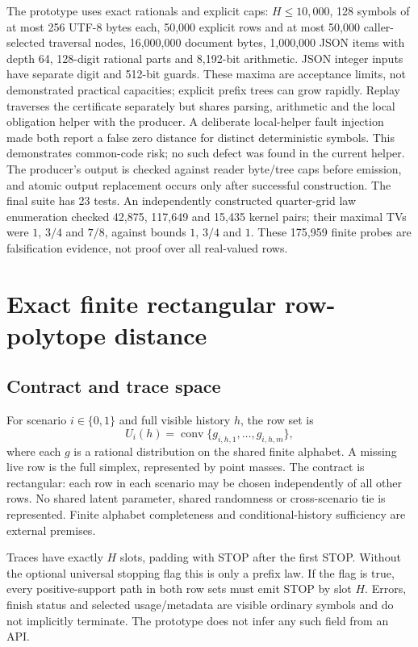 \documentclass[11pt,a4paper]{article}
\begin{document}
The prototype uses exact rationals and explicit caps: $H\leq10{,}000$, 128 symbols of at most 256 UTF-8 bytes each, 50,000 explicit rows and at most 50,000 caller-selected traversal nodes, 16,000,000 document bytes, 1,000,000 JSON items with depth 64, 128-digit rational parts and 8,192-bit arithmetic. JSON integer inputs have separate digit and 512-bit guards. These maxima are acceptance limits, not demonstrated practical capacities; explicit prefix trees can grow rapidly. Replay traverses the certificate separately but shares parsing, arithmetic and the local obligation helper with the producer. A deliberate local-helper fault injection made both report a false zero distance for distinct deterministic symbols. This demonstrates common-code risk; no such defect was found in the current helper. The producer's output is checked against reader byte/tree caps before emission, and atomic output replacement occurs only after successful construction. The final suite has 23 tests. An independently constructed quarter-grid law enumeration checked 42,875, 117,649 and 15,435 kernel pairs; their maximal TVs were $1$, $3/4$ and $7/8$, against bounds $1$, $3/4$ and $1$. These 175,959 finite probes are falsification evidence, not proof over all real-valued rows.

\section{Exact finite rectangular row-polytope distance}
\subsection{Contract and trace space}
For scenario $i\in\{0,1\}$ and full visible history $h$, the row set is
\[
U_i(h)=\operatorname{conv}\{g_{i,h,1},\ldots,g_{i,h,m}\},
\]
where each $g$ is a rational distribution on the shared finite alphabet. A missing live row is the full simplex, represented by point masses. The contract is rectangular: each row in each scenario may be chosen independently of all other rows. No shared latent parameter, shared randomness or cross-scenario tie is represented. Finite alphabet completeness and conditional-history sufficiency are external premises.

Traces have exactly $H$ slots, padding with STOP after the first STOP. Without the optional universal stopping flag this is only a prefix law. If the flag is true, every positive-support path in both row sets must emit STOP by slot $H$. Errors, finish status and selected usage/metadata are visible ordinary symbols and do not implicitly terminate. The prototype does not infer any such field from an API.
\end{document}
